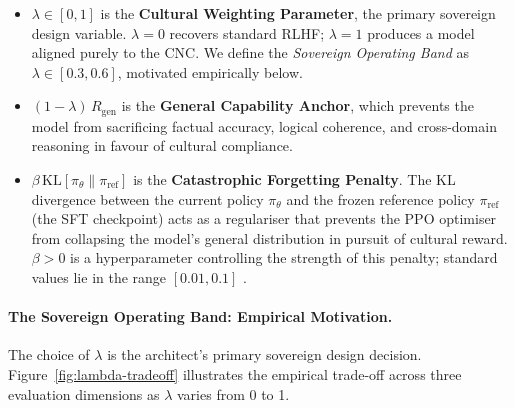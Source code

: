 \begin{itemize}
  \item $\lambda \in [0, 1]$ is the \textbf{Cultural Weighting
    Parameter}, the primary sovereign design variable.
    $\lambda = 0$ recovers standard RLHF; $\lambda = 1$ produces
    a model aligned purely to the CNC.
    We define the \emph{Sovereign Operating Band} as
    $\lambda \in [0.3, 0.6]$, motivated empirically below.

  \item $(1-\lambda)\,R_{\mathrm{gen}}$ is the
    \textbf{General Capability Anchor}, which prevents the model
    from sacrificing factual accuracy, logical coherence, and
    cross-domain reasoning in favour of cultural compliance.

  \item $\beta\,\mathrm{KL}[\pi_\theta \| \pi_{\mathrm{ref}}]$
    is the \textbf{Catastrophic Forgetting Penalty}.
    The KL divergence between the current policy $\pi_\theta$ and
    the frozen reference policy $\pi_{\mathrm{ref}}$ (the SFT
    checkpoint) acts as a regulariser that prevents the PPO
    optimiser from collapsing the model's general distribution in
    pursuit of cultural reward.
    $\beta > 0$ is a hyperparameter controlling the strength of
    this penalty; standard values lie in the range
    $[0.01, 0.1]$ \cite{ouyang2022}.
\end{itemize}

\paragraph{The Sovereign Operating Band: Empirical Motivation.}
The choice of $\lambda$ is the architect's primary sovereign design
decision.
Figure~\ref{fig:lambda-tradeoff} illustrates the empirical
trade-off across three evaluation dimensions as $\lambda$ varies
from 0 to 1.

